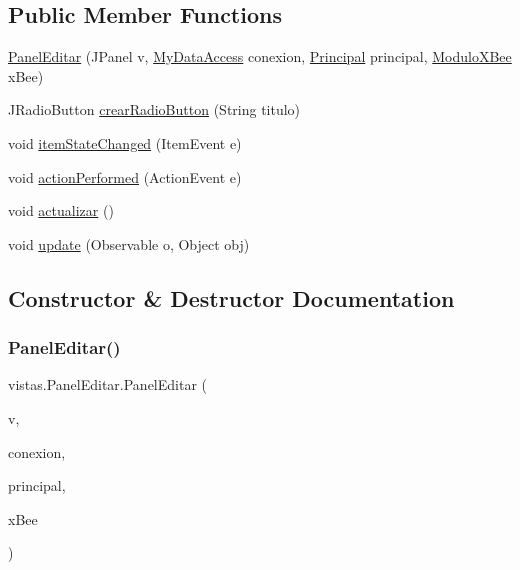 \subsection*{Public Member Functions}
\begin{DoxyCompactItemize}
\item 
\mbox{\hyperlink{classvistas_1_1_panel_editar_aaa23e1d6431066d28fb187133a1a91e3}{Panel\+Editar}} (J\+Panel v, \mbox{\hyperlink{classconexion_s_q_l_1_1_my_data_access}{My\+Data\+Access}} conexion, \mbox{\hyperlink{classvistas_1_1_principal}{Principal}} principal, \mbox{\hyperlink{classcomunicacion_1_1_modulo_x_bee}{Modulo\+X\+Bee}} x\+Bee)
\item 
J\+Radio\+Button \mbox{\hyperlink{classvistas_1_1_panel_editar_aa4871d051f2d6dc289bc087100a49684}{crear\+Radio\+Button}} (String titulo)
\item 
void \mbox{\hyperlink{classvistas_1_1_panel_editar_ab593922475414274e7e85587fa700e48}{item\+State\+Changed}} (Item\+Event e)
\item 
void \mbox{\hyperlink{classvistas_1_1_panel_editar_abfa1e278ba63d7cf2a14c02804dcadf1}{action\+Performed}} (Action\+Event e)
\item 
void \mbox{\hyperlink{classvistas_1_1_panel_editar_a785d026660ee2531aa4fbd29d1377370}{actualizar}} ()
\item 
void \mbox{\hyperlink{classvistas_1_1_panel_editar_ae0fe6b22793a1dddd5b8003e1c245788}{update}} (Observable o, Object obj)
\end{DoxyCompactItemize}


\subsection{Constructor \& Destructor Documentation}
\mbox{\label{classvistas_1_1_panel_editar_aaa23e1d6431066d28fb187133a1a91e3}} 
\subsubsection{\texorpdfstring{Panel\+Editar()}{PanelEditar()}}
{\footnotesize\ttfamily vistas.\+Panel\+Editar.\+Panel\+Editar (\begin{DoxyParamCaption}\item[{J\+Panel}]{v,  }\item[{\mbox{\hyperlink{classconexion_s_q_l_1_1_my_data_access}{My\+Data\+Access}}}]{conexion,  }\item[{\mbox{\hyperlink{classvistas_1_1_principal}{Principal}}}]{principal,  }\item[{\mbox{\hyperlink{classcomunicacion_1_1_modulo_x_bee}{Modulo\+X\+Bee}}}]{x\+Bee }\end{DoxyParamCaption})}


